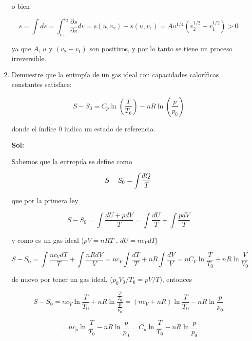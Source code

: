 \documentclass[12pt,a4paper]{article}
\newcommand{\dbar}{\mathchar'26\mkern-12mu d}
\begin{document}
\begin{enumerate}
o bien

\begin{equation*}
    s = \int ds = \int_{v_1}^{v_2} \frac{\partial s}{\partial v} dv = s(u,v_2) - s(u,v_1) = A u^{1/4} (v_{2}^{1/2} - v_{1}^{1/2}) > 0
\end{equation*}

ya que $A$, $u$ y $(v_2 - v_1)$ son positivos, y por lo tanto se tiene un proceso irreversible.






\item Demuestre que la entropía de un gas ideal con capacidades caloríficas constantes satisface:

\begin{equation*}
    S - S_0 = C_p \ln{\left(\frac{T}{T_0}\right)} - n R \ln{\left(\frac{p}{p_0}\right)}
\end{equation*}

donde el índice 0 indica un estado de referencia.

\textbf{Sol:}

Sabemos que la entropiía se define como

\begin{equation*}
    S - S_0 = \int \frac{\dbar Q}{T}
\end{equation*}

que por la primera ley

\begin{equation*}
    S - S_0 = \int \frac{dU + p dV }{T} = \int \frac{dU}{T} + \int \frac{p dV}{T}
\end{equation*}

y como es un gas ideal ($pV = nRT$ , $dU = n c_V dT$)

\begin{equation*}
    S- S_0 = \int \frac{n c_V dT}{T} + \int \frac{nR dV}{V} = nc_V \int \frac{dT}{T} + nR \int \frac{dV}{V} = nC_V \ln{\frac{T}{T_0}} + nR \ln{\frac{V}{V_0}}
\end{equation*}

de nuevo por tener un gas ideal, ($p_0 V_0 /T_0 = pV /T$), entonces

\begin{equation*}
    S - S_0 = n c_V \ln{\frac{T}{T_0}} + nR \ln{\frac{\frac{T}{T_0}}{\frac{p}{p_0}}} = (nc_V + nR) \ln{\frac{T}{T_0}} - nR \ln{\frac{p}{p_0}}
\end{equation*}

\begin{equation*}
    = n c_p  \ln{\frac{T}{T_0}} - nR \ln{\frac{p}{p_0}}= C_p \ln{\frac{T}{T_0}} - nR \ln{\frac{p}{p_0}}
\end{equation*}




\end{enumerate}
\end{document}
